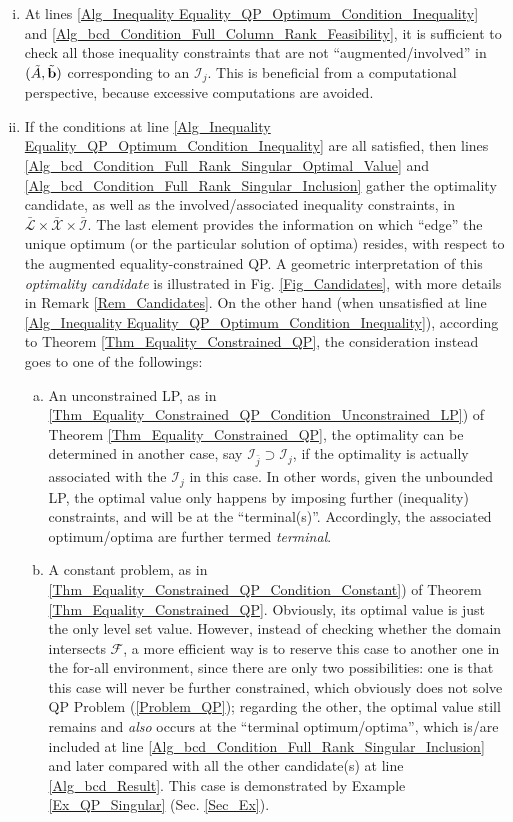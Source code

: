 \documentclass{imaman}
\newcommand{\bfb}{{\bf b}}
\newcommand{\calF}{{\mathcal F}}
\newcommand{\calI}{{\mathcal I}}
\newcommand{\calL}{{\mathcal L}}
\newcommand{\calX}{{\mathcal X}}
\numberwithin{equation}{section}
\begin{document}
\newpage\begin{enumerate}[i)]
\item At lines \ref{Alg_Inequality Equality_QP_Optimum_Condition_Inequality} and \ref{Alg_bcd_Condition_Full_Column_Rank_Feasibility}, it is sufficient to check all those inequality constraints that are not ``augmented/involved'' in $(\tilde A,\tilde\bfb)$ corresponding to an $\calI_j$. This is beneficial from a computational perspective, because excessive computations are avoided.
\item If the conditions at line \ref{Alg_Inequality Equality_QP_Optimum_Condition_Inequality} are all satisfied, then lines \ref{Alg_bcd_Condition_Full_Rank_Singular_Optimal_Value} and \ref{Alg_bcd_Condition_Full_Rank_Singular_Inclusion} gather the optimality candidate, as well as the involved/associated inequality constraints, in $\bar\calL\times\bar\calX\times\bar\calI$. The last element provides the information on which ``edge'' the unique optimum (or the particular solution of optima) resides, with respect to the augmented equality-constrained QP. A geometric interpretation of this \textit{optimality candidate} is illustrated in Fig. \ref{Fig_Candidates}, with more details in Remark \ref{Rem_Candidates}. On the other hand (when unsatisfied at line \ref{Alg_Inequality Equality_QP_Optimum_Condition_Inequality}), according to Theorem \ref{Thm_Equality_Constrained_QP}, the consideration instead goes to one of the followings:
    \begin{enumerate}[a)]
    \item\label{App_Proof_QP_bcd_LP} An unconstrained LP, as in \ref{Thm_Equality_Constrained_QP_Condition_Unconstrained_LP}) of Theorem \ref{Thm_Equality_Constrained_QP}, the optimality can be determined in another case, say $\calI_{\bar j}\supset\calI_j$, if the optimality is actually associated with the $\calI_j$ in this case. In other words, given the unbounded LP, the optimal value only happens by imposing further (inequality) constraints, and will be at the ``terminal(s)''. Accordingly, the associated optimum/optima are further termed \textit{terminal}.
    \item\label{App_Proof_QP_bcd_Constant} A constant problem, as in \ref{Thm_Equality_Constrained_QP_Condition_Constant}) of Theorem \ref{Thm_Equality_Constrained_QP}. Obviously, its optimal value is just the only level set value. However, instead of checking whether the domain intersects $\calF$, a more efficient way is to reserve this case to another one in the for-all environment, since there are only two possibilities: one is that this case will never be further constrained, which obviously does not solve QP Problem (\ref{Problem_QP}); regarding the other, the optimal value still remains and \textit{also} occurs at the ``terminal optimum/optima'', which is/are included at line \ref{Alg_bcd_Condition_Full_Rank_Singular_Inclusion} and later compared with all the other candidate(s) at line \ref{Alg_bcd_Result}. This case is demonstrated by Example \ref{Ex_QP_Singular} (Sec. \ref{Sec_Ex}).

\end{enumerate}
\end{enumerate}
\end{document}
